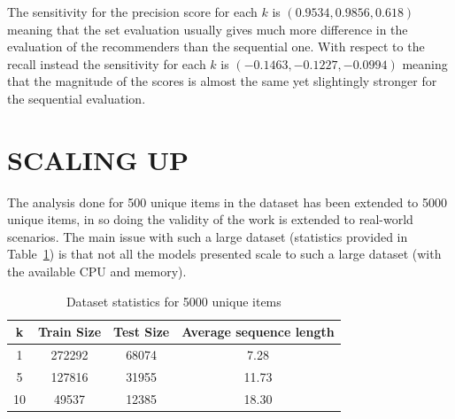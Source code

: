 \documentclass[prodmode,acmtecs]{acmsmall} %
\begin{document}
The sensitivity for the precision score for each $k$ is $(0.9534,  0.9856,  0.618)$ meaning that the set evaluation usually gives much more difference in the evaluation of the recommenders than the sequential one. With respect to the recall instead the sensitivity for each $k$ is $(-0.1463, -0.1227, -0.0994)$ meaning that the magnitude of the scores is almost the same yet slightingly stronger for the sequential evaluation.

\section{SCALING UP}
The analysis done for 500 unique items in the dataset has been extended to 5000 unique items, in so doing the validity of the work is extended to real-world scenarios. The main issue with such a large dataset (statistics provided in Table~\ref{data5000}) is that not all the models presented scale to such a large dataset (with the available CPU and memory).

\begin{table}[H]
	\centering
	\caption{Dataset statistics for 5000 unique items}
	\label{data5000}
	\begin{tabular}{|c|c|c|c|}
		\hline
		\textbf{k} & \textbf{Train Size} & \textbf{Test Size} & \textbf{Average sequence length} \\ \hline
		1          & 272292              & 68074              & 7.28                             \\ \hline
		5          & 127816               & 31955               & 11.73                            \\ \hline
		10         & 49537                & 12385               & 18.30                            \\ \hline
	\end{tabular}
\end{table}
\end{document}

